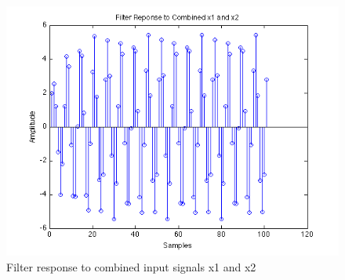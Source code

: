 \documentclass{article}
\begin{document}
\begin{figure}[here]
	\begin{center}
		\includegraphics [width=5in]{Project2_05.png}
		\caption{Filter response to combined input signals x1 and x2}
		\label{fig:combresp}
	\end{center}
\end{figure}
\end{document}
